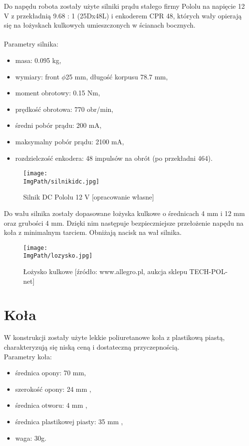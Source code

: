 \documentclass[a4paper,12pt,twoside,openany]{report}
\newcommand{\ImgPath}{.}
\begin{document}
Do napędu robota zostały użyte silniki prądu stałego firmy Pololu na napięcie 12 V z przekładnią 9.68 : 1 (25Dx48L) i enkoderem CPR 48, których wały opierają się na łożyskach kulkowych umieszczonych w ścianach bocznych.\\
\\
Parametry silnika:
\begin{itemize}
\item masa: 0.095 kg,
\item wymiary: front $\phi$25 mm, długość korpusu 78.7 mm,
\item moment obrotowy: 0.15 Nm,
\item prędkość obrotowa:	770 obr/min,
\item średni pobór prądu:	200 mA,
\item maksymalny pobór prądu:	2100 mA,
\item rozdzielczość enkodera: 48 impulsów na obrót (po przekładni 464).
\end{itemize}

\begin{figure}[!htbp]
	\begin{center}
\centering
\texttt{[image: \\ImgPath/silnikidc.jpg]}
\end{center}
	\caption{Silnik DC Pololu 12 V [opracowanie własne]}
	\label{schematKomunikacji}
\end{figure}

\newpage
\noindent Do wału silnika zostały dopasowane łożyska kulkowe o średnicach 4 mm i 12 mm oraz grubości 4 mm. Dzięki nim następuje bezpieczniejsze przełożenie napędu na koła z minimalnym tarciem. Obniżają nacisk na wał silnika.

\begin{figure}[!htbp]
	\begin{center}
\centering
\texttt{[image: \\ImgPath/lozysko.jpg]}
\end{center}
	\caption{Łożysko kulkowe [źródło: www.allegro.pl, aukcja sklepu TECH-POL-net]}
	\label{schematKomunikacji}
\end{figure}
 
\section{Koła}

W konstrukcji zostały użyte lekkie poliuretanowe koła z plastikową piastą, charakteryzują się niską ceną i dostateczną przyczepnością.\\
Parametry koła:
\begin{itemize}
\item średnica opony: 70 mm,
\item szerokość opony: 24 mm ,
\item średnica otworu: 4 mm ,
\item średnica plastikowej piasty: 35 mm ,
\item waga: 30g.
\end{itemize}
\end{document}

